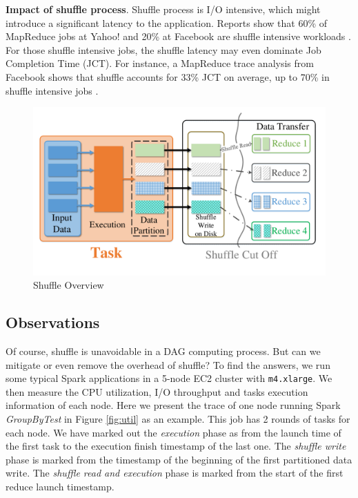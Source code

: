 
\textbf{Impact of shuffle process}. Shuffle process is I/O intensive, which might introduce a significant latency to the application. Reports show that 60\% of MapReduce jobs at Yahoo!
and 20\% at Facebook are shuffle intensive workloads \cite{shufflewatcher}. For those shuffle intensive jobs, the shuffle latency may even dominate Job Completion Time (JCT).
For instance, a MapReduce trace analysis from Facebook shows that shuffle accounts for 33\% JCT on average, up to 70\% in shuffle intensive jobs \cite{managing}.
\begin{figure}
	\centering
	\includegraphics[width=\linewidth]{fig/shuffle_process}
	\caption{Shuffle Overview}
	\label{fig:shuffle_process}
\end{figure}

\subsection{Observations} \label{observation}
Of course, shuffle is unavoidable in a DAG computing process. But can we mitigate or even remove the overhead of shuffle? To find the answers, we run some typical Spark applications in a 5-node EC2 cluster with \texttt{m4.xlarge}. We then measure the CPU utilization, I/O throughput and tasks execution information of each node. Here we present the trace of one node running Spark \textit{GroupByTest} in Figure \ref{fig:util} as an example. This job has 2 rounds of tasks for each node.
We have marked out the \textit{execution} phase as from the launch time of the first task to the execution finish timestamp of the last one. The \textit{shuffle write} phase is marked from the timestamp of the beginning of the first partitioned data write. The \textit{shuffle read and execution} phase is marked from the start of the first reduce launch timestamp.

